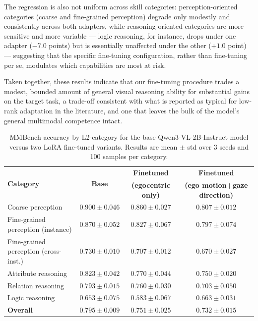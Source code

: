 \documentclass[letterpaper, 10pt, journal]{IEEEtran}  %
\begin{document}
The regression is also not uniform across skill categories: perception-oriented categories (coarse and fine-grained perception) degrade only modestly and consistently across both adapters, while reasoning-oriented categories are more sensitive and more variable — logic reasoning, for instance, drops under one adapter ($-7.0$ points) but is essentially unaffected under the other ($+1.0$ point) — suggesting that the specific fine-tuning configuration, rather than fine-tuning per se, modulates which capabilities are most at risk. 

Taken together, these results indicate that our fine-tuning procedure trades a modest, bounded amount of general visual reasoning ability for substantial gains on the target task, a trade-off consistent with what is reported as typical for low-rank adaptation in the literature, and one that leaves the bulk of the model's general multimodal competence intact.



\begin{table}[t]
\small
\centering
\caption{MMBench accuracy by L2-category for the base Qwen3-VL-2B-Instruct model versus two LoRA fine-tuned variants. Results are mean $\pm$ std over 3 seeds and 100 samples per category.}
\label{tab:mmbench_regression}
\begin{tabular}{lccc}
\toprule
\multirow{2}{*}{\textbf{Category}} & \multirow{2}{*}{\textbf{Base}} & \textbf{Finetuned} & \textbf{Finetuned} \\
& & \textbf{(egocentric only)} & \textbf{(ego motion+gaze direction)} \\
\midrule
Coarse perception                    & $0.900 \pm 0.046$ & $0.860 \pm 0.027$ & $0.807 \pm 0.012$ \\
Fine-grained perception (instance)   & $0.870 \pm 0.052$ & $0.827 \pm 0.067$ & $0.797 \pm 0.074$ \\
Fine-grained perception (cross-inst.)& $0.730 \pm 0.010$ & $0.707 \pm 0.012$ & $0.670 \pm 0.027$ \\
Attribute reasoning                  & $0.823 \pm 0.042$ & $0.770 \pm 0.044$ & $0.750 \pm 0.020$ \\
Relation reasoning                   & $0.793 \pm 0.015$ & $0.760 \pm 0.030$ & $0.703 \pm 0.050$ \\
Logic reasoning                      & $0.653 \pm 0.075$ & $0.583 \pm 0.067$ & $0.663 \pm 0.031$ \\
\midrule
\textbf{Overall}                     & $\mathbf{0.795 \pm 0.009}$ & $\mathbf{0.751 \pm 0.025}$ & $\mathbf{0.732 \pm 0.015}$ \\
\bottomrule
\end{tabular}
\end{table}
\end{document}
